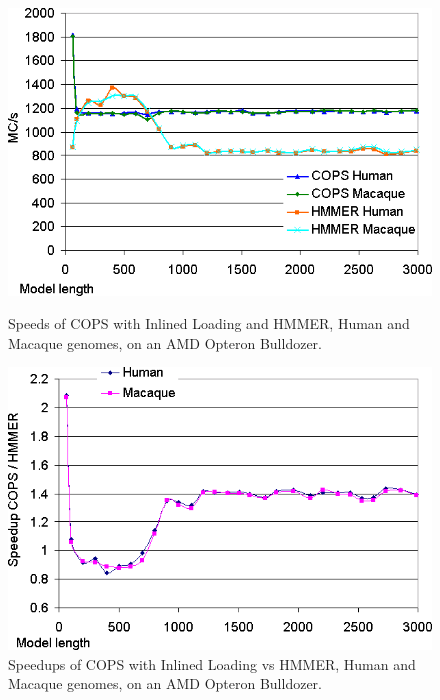 \begin{figure}[H]
    \begin{minipage}{0.48\linewidth}
		\centering
		\includegraphics[scale=0.46]{graphics/inlined-aleph-runtimes.png}
		\caption[Speeds of COPS with Inlined Loading and HMMER on an AMD Opteron Bulldozer] 
		{Speeds of COPS with Inlined Loading and HMMER, Human and Macaque genomes, on an AMD Opteron Bulldozer.}
		\label{inlined-aleph-runtimes}
    \end{minipage}
    \hspace{0.04\linewidth}
    \begin{minipage}{0.48\linewidth}
		\centering
		\includegraphics[scale=0.46]{graphics/inlined-aleph-speedups.png}
		\caption[Speedups of COPS with Inlined Loading vs HMMER on an AMD Opteron Bulldozer] 
		{Speedups of COPS with Inlined Loading vs HMMER, Human and Macaque genomes, on an AMD Opteron Bulldozer.}
		\label{inlined-aleph-speedups}
    \end{minipage}
\end{figure} 

